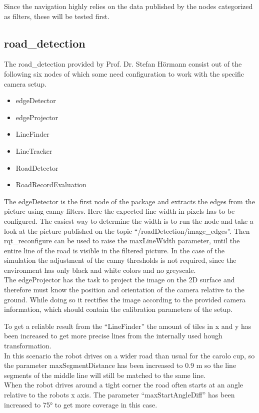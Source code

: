 Since the navigation highly relies on the data published by the nodes categorized as filters, these will be tested first.

\subsection{road\_detection}
The road\_detection provided by Prof. Dr. Stefan Hörmann consist out of the following six nodes of which some need configuration to work with the specific camera setup.

\begin{itemize}
	\item edgeDetector
	\item edgeProjector
	\item LineFinder
	\item LineTracker
	\item RoadDetector
	\item RoadRecordEvaluation
\end{itemize}

The edgeDetector is the first node of the package and extracts the edges from the picture using canny filters. Here the expected line width in pixels has to be configured. The easiest way to determine the width is to run the node and take a look at the picture published on the topic ``/roadDetection/image\_edges''. Then rqt\_reconfigure can be used to raise the maxLineWidth parameter, until the entire line of the road is visible in the filtered picture. In the case of the simulation the adjustment of the canny thresholds is not required, since the environment has only black and white colors and no greyscale.\\

The edgeProjector has the task to project the image on the 2D surface and therefore must know the position and orientation of the camera relative to the ground. While doing so it rectifies the image according to the provided camera information, which should contain the calibration parameters of the setup.

To get a reliable result from the ``LineFinder'' the amount of tiles in x and y has been increased to get more precise lines from the internally used hough transformation.\\
In this scenario the robot drives on a wider road than usual for the carolo cup, so the parameter maxSegmentDistance has been increased to 0.9 m so the line segments of the middle line will still be matched to the same line.\\
When the robot drives around a tight corner the road often starts at an angle relative to the robots x axis. The parameter ``maxStartAngleDiff'' has been increased to 75° to get more coverage in this case.\\

